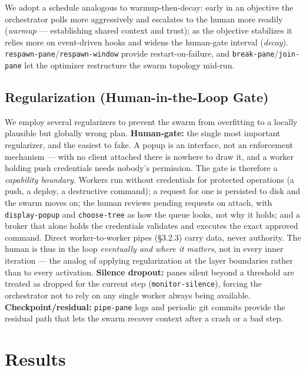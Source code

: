 \documentclass[10pt]{article}
\newcommand{\code}[1]{\texttt{\small #1}}
\begin{document}
We adopt a schedule analogous to warmup-then-decay: early in an objective the
orchestrator polls more aggressively and escalates to the human more readily
(\emph{warmup} --- establishing shared context and trust); as the objective stabilizes
it relies more on event-driven hooks and widens the human-gate interval
(\emph{decay}). \code{respawn-pane}/\code{respawn-window} provide restart-on-failure,
and \code{break-pane}/\code{join-pane} let the optimizer restructure the swarm topology
mid-run.

\subsection{Regularization (Human-in-the-Loop Gate)}\label{sec:reg}

We employ several regularizers to prevent the swarm from overfitting to a locally
plausible but globally wrong plan. \textbf{Human-gate:} the single most important
regularizer, and the easiest to fake. A popup is an interface, not an enforcement
mechanism --- with no client attached there is nowhere to draw it, and a worker
holding push credentials needs nobody's permission. The gate is therefore a
\emph{capability boundary}. Workers run without credentials for protected
operations (a push, a deploy, a destructive command); a request for one is
persisted to disk and the swarm moves on; the human reviews pending requests on
attach, with \code{display-popup} and \code{choose-tree} as how the queue looks,
not why it holds; and a broker that alone holds the credentials validates and
executes the exact approved command. Direct worker-to-worker pipes
(\S 3.2.3) carry data, never authority. The human is thus in the loop
\emph{eventually and where it matters}, not in every inner iteration --- the analog
of applying regularization at the layer boundaries rather than to every activation.
\textbf{Silence dropout:} panes silent beyond a threshold are treated as dropped for
the current step (\code{monitor-silence}), forcing the orchestrator not to rely on any
single worker always being available. \textbf{Checkpoint/residual:} \code{pipe-pane}
logs and periodic git commits provide the residual path that lets the swarm recover
context after a crash or a bad step.

\section{Results}
\end{document}
